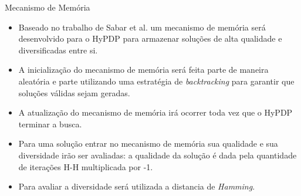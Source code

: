 \begin{frame}[allowframebreaks]{Mecanismo de Memória}	
	
	\begin{itemize}
		\item Baseado no trabalho de Sabar et al. \cite{sabar2015automatic} um mecanismo de memória será desenvolvido para o HyPDP para armazenar soluções de alta qualidade e diversificadas entre si.
		\item A inicialização do mecanismo de memória será feita parte de maneira aleatória e parte utilizando uma estratégia de \textit{backtracking} para garantir que soluções válidas sejam geradas.
		\item A atualização do mecanismo de memória irá ocorrer toda vez que o HyPDP terminar a busca. 
		\item Para uma solução entrar no mecanismo de memória sua qualidade e sua diversidade irão ser avaliadas: a qualidade da solução é dada pela quantidade de iterações H-H multiplicada por -1. \item Para avaliar a diversidade será utilizada a distancia de \textit{Hamming}.
	
		
			
	\end{itemize}
	
\end{frame}



